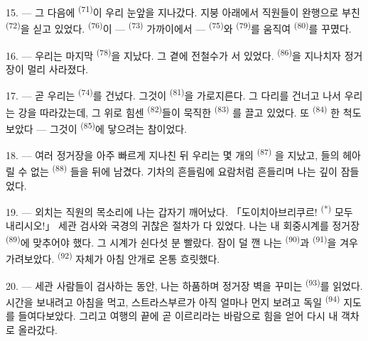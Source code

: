 
15. --- 그 다음에  \textsuperscript{(71)}이 우리 눈앞을 지나갔다.
지붕 아래에서 직원들이 완행으로 부친  \textsuperscript{(72)}을 싣고 있었다.
 \textsuperscript{(76)}이 —  \textsuperscript{(73)} 가까이에서
—  \textsuperscript{(75)}와  \textsuperscript{(79)}를 움직여
 \textsuperscript{(80)}를 꾸몄다.

16. --- 우리는 마지막  \textsuperscript{(78)}을 지났다. 그 곁에 전철수가
서 있었다.  \textsuperscript{(86)}을 지나치자 정거장이 멀리 사라졌다.

17. --- 곧 우리는  \textsuperscript{(74)}를 건넜다. 그것이 
\textsuperscript{(81)}을 가로지른다. 그 다리를 건너고 나서 우리는 강을 따라갔는데, 그
위로 힘센  \textsuperscript{(82)}들이 묵직한  \textsuperscript{(83)}
를 끌고 있었다. 또  \textsuperscript{(84)} 한 척도 보았다 — 그것이
 \textsuperscript{(85)}에 닿으려는 참이었다.

18. --- 여러 정거장을 아주 빠르게 지나친 뒤 우리는 몇 개의  \textsuperscript{(87)}
을 지났고, 들의 헤아릴 수 없는  \textsuperscript{(88)}
들을 뒤에 남겼다. 기차의 흔들림에 요람처럼 흔들리며 나는 깊이 잠들었다.

\VUsaut{3.0mm}
\VUsaut{3.0mm}

19. --- 외치는 직원의 목소리에 나는 갑자기 깨어났다. 「도이치아브리쿠르!
\textsuperscript{(*)} 모두 내리시오!」 세관 검사와 국경의 귀찮은 절차가 다 있었다. 나는
내 회중시계를 정거장  \textsuperscript{(89)}에 맞추어야 했다. 그 시계가
쉰다섯 분 빨랐다. 잠이 덜 깬 나는  \textsuperscript{(90)}과
 \textsuperscript{(91)}을 겨우 가려보았다. 
\textsuperscript{(92)} 자체가 아침 안개로 온통 흐릿했다.

20. --- 세관 사람들이 검사하는 동안, 나는 하품하며 정거장 벽을 꾸미는 
\textsuperscript{(93)}를 읽었다. 시간을 보내려고 아침을 먹고, 스트라스부르가 아직 얼마나
먼지 보려고 독일  \textsuperscript{(94)} 지도를 들여다보았다. 그리고 여행의
끝에 곧 이르리라는 바람으로 힘을 얻어 다시 내 객차로 올라갔다.

\VUsaut{6.0mm}
\VUfilet{22mm}

